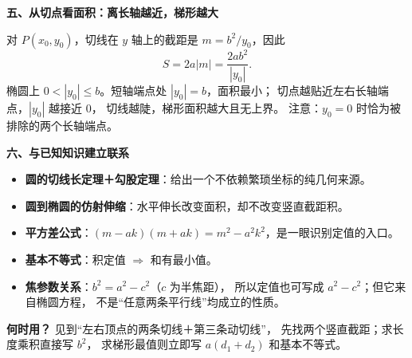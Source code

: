\begin{explanationbox}
\textbf{五、从切点看面积：离长轴越近，梯形越大}

对 $P(x_0,y_0)$，切线在 $y$ 轴上的截距是
$m=b^2/y_0$，因此
\[
\boxed{S=2a|m|=\frac{2ab^2}{|y_0|}.}
\]
椭圆上 $0<|y_0|\le b$。短轴端点处 $|y_0|=b$，面积最小；
切点越贴近左右长轴端点，$|y_0|$ 越接近 $0$，
切线越陡，梯形面积越大且无上界。
注意：$y_0=0$ 时恰为被排除的两个长轴端点。

\textbf{六、与已知知识建立联系}
\begin{itemize}
  \item \textbf{圆的切线长定理＋勾股定理}：给出一个不依赖繁琐坐标的纯几何来源。
  \item \textbf{圆到椭圆的仿射伸缩}：水平伸长改变面积，却不改变竖直截距积。
  \item \textbf{平方差公式}：$(m-ak)(m+ak)=m^2-a^2k^2$，是一眼识别定值的入口。
  \item \textbf{基本不等式}：积定值 $\Rightarrow$ 和有最小值。
  \item \textbf{焦参数关系}：$b^2=a^2-c^2$（$c$ 为半焦距），
  所以定值也可写成 $a^2-c^2$；但它来自椭圆方程，
  不是“任意两条平行线”均成立的性质。
\end{itemize}

\textbf{何时用？} 见到“左右顶点的两条切线＋第三条动切线”，
先找两个竖直截距；求长度乘积直接写 $b^2$，
求梯形最值则立即写 $a(d_1+d_2)$ 和基本不等式。
\end{explanationbox}
